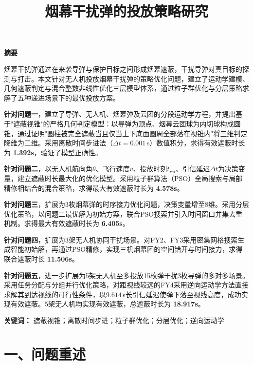 \documentclass[12pt,a4paper]{article}
\title{\fontsize{22}{28}\selectfont\bfseries 烟幕干扰弹的投放策略研究}
\author{}
\date{}
\begin{document}
\maketitle

\begin{center}
{\fontsize{14}{18}\selectfont\bfseries 摘\quad 要}
\end{center}

\noindent 烟幕干扰弹通过在来袭导弹与保护目标之间形成烟幕遮蔽，干扰导弹对真目标的探测与打击。本文针对无人机投放烟幕干扰弹的策略优化问题，建立了运动学建模、几何遮蔽判定与混合整数非线性优化三层模型体系，通过粒子群优化与分层策略求解了五种递进场景下的最优投放方案。

\noindent \textbf{针对问题一}，建立了导弹、无人机、烟幕弹及云团的分段运动学方程，并提出基于"遮蔽视锥"的严格几何判定模型：以导弹为顶点、烟幕云团球为内切球构成圆锥，通过证明"圆柱被完全遮蔽当且仅当上下底面圆周全部落在视锥内"将三维判定降维为二维。采用离散时间步进法（$\Delta t=0.001$\,s）数值积分，求得有效遮蔽时长为 \textbf{1.392s}，验证了模型正确性。

\noindent \textbf{针对问题二}，以无人机航向角$\theta$、飞行速度$v$、投放时刻$t_{rel}$、引信延迟$\Delta t$为决策变量，建立遮蔽时长最大化的优化模型。采用粒子群算法（PSO）全局搜索与局部精修相结合的混合策略，求得最大有效遮蔽时长为 \textbf{4.578s}。

\noindent \textbf{针对问题三}，扩展为3枚烟幕弹的时序接力优化问题，决策变量增至8维。采用分层优化策略，以问题二最优解为初始方案，联合PSO搜索并引入时间窗口并集去重机制。求得最大有效遮蔽时长为 \textbf{6.405s}。

\noindent \textbf{针对问题四}，扩展为3架无人机协同干扰场景。对FY2、FY3采用密集网格搜索生成智能初始解，再通过PSO精修，实现三机烟幕团的空间错开与时间接力，求得联合遮蔽时长 \textbf{11.506s}。

\noindent \textbf{针对问题五}，进一步扩展为5架无人机至多投放15枚弹干扰3枚导弹的多对多场景。采用任务分配与分组并行优化策略，对距视线较远的FY4采用逆向运动学方法直接求解其到达视线的可行性条件，以$9.614$\,s长引信延迟使弹下落至视线高度，成功实现有效遮蔽。5架无人机均实现有效遮蔽，总遮蔽时长为 \textbf{18.917s}。

\noindent \textbf{关键词：} 遮蔽视锥；离散时间步进；粒子群优化；分层优化；逆向运动学

\newpage

\section{一、问题重述}
\end{document}
